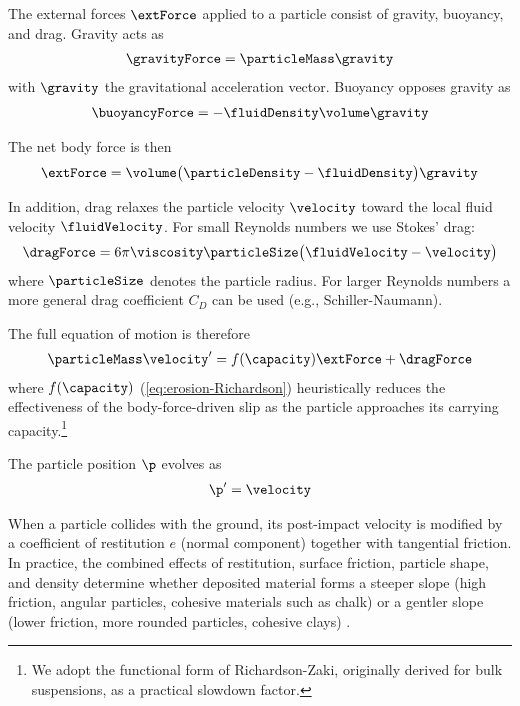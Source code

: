 The external forces $\extForce$ applied to a particle consist of gravity, buoyancy, and drag. Gravity acts as
\begin{align}
    \gravityForce = \particleMass \gravity
\end{align}
with $\gravity$ the gravitational acceleration vector. Buoyancy opposes gravity as
\begin{align}
    \buoyancyForce = -\fluidDensity \volume \gravity
\end{align}

The net body force is then
\begin{align}
\label{eq:erosion-bodyforce}
    \extForce = \volume \big(\particleDensity - \fluidDensity\big)\gravity
\end{align}

In addition, drag relaxes the particle velocity $\velocity$ toward the local fluid velocity $\fluidVelocity$. For small Reynolds numbers we use Stokes’ drag:
\begin{align}
    \label{eq:erosion-drag}
    \dragForce = 6\pi \viscosity \particleSize \big(\fluidVelocity - \velocity\big)
\end{align}
where $\particleSize$ denotes the particle radius. For larger Reynolds numbers a more general drag coefficient $C_D$ can be used (e.g., Schiller-Naumann).

The full equation of motion is therefore
\begin{align}
    \label{eq:erosion-ode}
    \particleMass  \velocity' = f(\capacity)\extForce + \dragForce
\end{align}
where $f(\capacity)$ (\cref{eq:erosion-Richardson}) heuristically reduces the effectiveness of the body-force-driven slip as the particle approaches its carrying capacity.\footnote{We adopt the functional form of Richardson-Zaki, originally derived for bulk suspensions, as a practical slowdown factor.}

The particle position $\p$ evolves as
\begin{align}
    \label{eq:erosion-kinematics}
    \p' = \velocity
\end{align}

When a particle collides with the ground, its post-impact velocity is modified by a coefficient of restitution $e$ (normal component) together with tangential friction. In practice, the combined effects of restitution, surface friction, particle shape, and density determine whether deposited material forms a steeper slope (high friction, angular particles, cohesive materials such as chalk) or a gentler slope (lower friction, more rounded particles, cohesive clays) \cite{Yan2020}.

